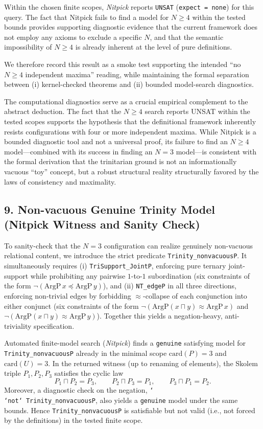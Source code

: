 \documentclass[a4paper, 11pt]{article}
\theoremstyle{plain}
\theoremstyle{definition}
\newcommand{\sqinter}{\sqcap}             %
\begin{document}
Within the chosen finite scopes, \textit{Nitpick} reports \texttt{UNSAT} (\texttt{expect = none}) for this query.
The fact that Nitpick fails to find a model for $N \ge 4$ within the tested bounds provides supporting diagnostic evidence that the current framework does not employ any axioms to exclude a specific $N$, and that the semantic impossibility of $N \ge 4$ is already inherent at the level of pure definitions.

We therefore record this result as a smoke test supporting the intended ``no $N\ge 4$ independent maxima'' reading,
while maintaining the formal separation between (i) kernel-checked theorems and (ii) bounded model-search diagnostics.

The computational diagnostics serve as a crucial empirical complement to the abstract deduction. The fact that the $N \ge 4$ search reports UNSAT within the tested scopes supports the hypothesis that the definitional framework inherently resists configurations with four or more independent maxima. While Nitpick is a bounded diagnostic tool and not a universal proof, its failure to find an $N \ge 4$ model—combined with its success in finding an $N=3$ model—is consistent with the formal derivation that the trinitarian ground is not an informationally vacuous ``toy'' concept, but a robust structural reality structurally favored by the laws of consistency and maximality.

\subsection{9. Non-vacuous Genuine Trinity Model (Nitpick Witness and Sanity Check)}
\label{subsec:nonvacuous_trinity}

To sanity-check that the $N=3$ configuration can realize genuinely non-vacuous relational content, we introduce the strict predicate \texttt{Trinity\_nonvacuousP}. It simultaneously requires
(i) \texttt{TriSupport\_JointP}, enforcing pure ternary joint-support while prohibiting any pairwise $1$-to-$1$ subordination (six constraints of the form $\neg(\mathrm{ArgP}\,x \preceq \mathrm{ArgP}\,y)$), and
(ii) \texttt{NT\_edgeP} in all three directions, enforcing non-trivial edges by forbidding $\approx$-collapse of each conjunction into either conjunct (six constraints of the form $\neg(\mathrm{ArgP}(x \sqinter y) \approx \mathrm{ArgP}\,x)$ and $\neg(\mathrm{ArgP}(x \sqinter y) \approx \mathrm{ArgP}\,y)$).
Together this yields a negation-heavy, anti-triviality specification.

Automated finite-model search (\textit{Nitpick}) finds a \texttt{genuine} satisfying model for \texttt{Trinity\_nonvacuousP} already in the minimal scope $\mathrm{card}(P)=3$ and $\mathrm{card}(U)=3$. In the returned witness (up to renaming of elements), the Skolem triple $P_1,P_2,P_3$ satisfies the cyclic law
\[
P_1 \sqinter P_2 = P_3,\qquad
P_2 \sqinter P_3 = P_1,\qquad
P_3 \sqinter P_1 = P_2.
\]
Moreover, a diagnostic check on the negation, \texttt{\char`\\\char`\<not\char`\> Trinity\_nonvacuousP}, also yields a \texttt{genuine} model under the same bounds. Hence \texttt{Trinity\_nonvacuousP} is satisfiable but not valid (i.e., not forced by the definitions) in the tested finite scope.
\end{document}
